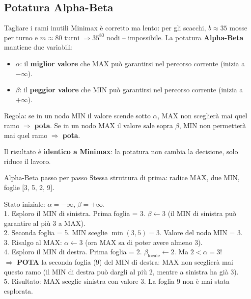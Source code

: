 \documentclass[12pt,a4paper]{article}
\begin{document}
\subsection{Potatura Alpha-Beta}

\begin{narrativo}{Tagliare i rami inutili}
Minimax è corretto ma lento: per gli scacchi, $b \approx 35$ mosse per turno e $m \approx 80$ turni $\Rightarrow 35^{80}$ nodi -- impossibile. La potatura \textbf{Alpha-Beta} mantiene due variabili:
\begin{itemize}[noitemsep]
  \item $\alpha$: il \textbf{miglior valore} che MAX può garantirsi nel percorso corrente (inizia a $-\infty$).
  \item $\beta$: il \textbf{peggior valore} che MIN può garantirsi nel percorso corrente (inizia a $+\infty$).
\end{itemize}
Regola: se in un nodo MIN il valore scende sotto $\alpha$, MAX non sceglierà mai quel ramo $\Rightarrow$ \textbf{pota}. Se in un nodo MAX il valore sale sopra $\beta$, MIN non permetterà mai quel ramo $\Rightarrow$ \textbf{pota}.

Il risultato è \textbf{identico a Minimax}: la potatura non cambia la decisione, solo riduce il lavoro.
\end{narrativo}

\begin{esempio}{Alpha-Beta passo per passo}
Stessa struttura di prima: radice MAX, due MIN, foglie [3, 5, 2, 9].

Stato iniziale: $\alpha = -\infty$, $\beta = +\infty$.\\
1. Esploro il MIN di sinistra. Prima foglia = 3. $\beta \leftarrow 3$ (il MIN di sinistra può garantire al più 3 a MAX).\\
2. Seconda foglia = 5. MIN sceglie $\min(3,5)=3$. Valore del nodo MIN = 3.\\
3. Risalgo al MAX: $\alpha \leftarrow 3$ (ora MAX sa di poter avere almeno 3).\\
4. Esploro il MIN di destra. Prima foglia = 2. $\beta_{\text{locale}} \leftarrow 2$. Ma $2 < \alpha = 3$!\\
   $\Rightarrow$ \textbf{POTA} la seconda foglia (9) del MIN di destra: MAX non sceglierà mai questo ramo (il MIN di destra può dargli al più 2, mentre a sinistra ha già 3).\\
5. Risultato: MAX sceglie sinistra con valore 3. La foglia 9 non è mai stata esplorata.
\end{esempio}
\end{document}

